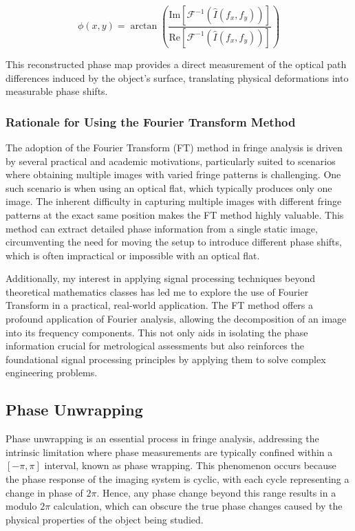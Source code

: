 \documentclass[../main.tex]{subfiles}
\begin{document}
\begin{equation}
    \phi(x, y) = \arctan\left(\frac{\text{Im}[\mathcal{F}^{-1}(\hat{I}(f_x, f_y))]}{\text{Re}[\mathcal{F}^{-1}(\hat{I}(f_x, f_y))]}\right)
\end{equation}

This reconstructed phase map provides a direct measurement of the optical path differences induced by the object's surface, translating physical deformations into measurable phase shifts.

\subsubsection{Rationale for Using the Fourier Transform Method}
The adoption of the Fourier Transform (FT) method in fringe analysis is driven by several practical and academic motivations, particularly suited to scenarios where obtaining multiple images with varied fringe patterns is challenging. One such scenario is when using an optical flat, which typically produces only one image. The inherent difficulty in capturing multiple images with different fringe patterns at the exact same position makes the FT method highly valuable. This method can extract detailed phase information from a single static image, circumventing the need for moving the setup to introduce different phase shifts, which is often impractical or impossible with an optical flat.

Additionally, my interest in applying signal processing techniques beyond theoretical mathematics classes has led me to explore the use of Fourier Transform in a practical, real-world application. The FT method offers a profound application of Fourier analysis, allowing the decomposition of an image into its frequency components. This not only aids in isolating the phase information crucial for metrological assessments but also reinforces the foundational signal processing principles by applying them to solve complex engineering problems.

\subsection{Phase Unwrapping}
Phase unwrapping is an essential process in fringe analysis, addressing the intrinsic limitation where phase measurements are typically confined within a $[-\pi, \pi]$ interval, known as phase wrapping. This phenomenon occurs because the phase response of the imaging system is cyclic, with each cycle representing a change in phase of $2\pi$. Hence, any phase change beyond this range results in a modulo $2\pi$ calculation, which can obscure the true phase changes caused by the physical properties of the object being studied.
\end{document}
